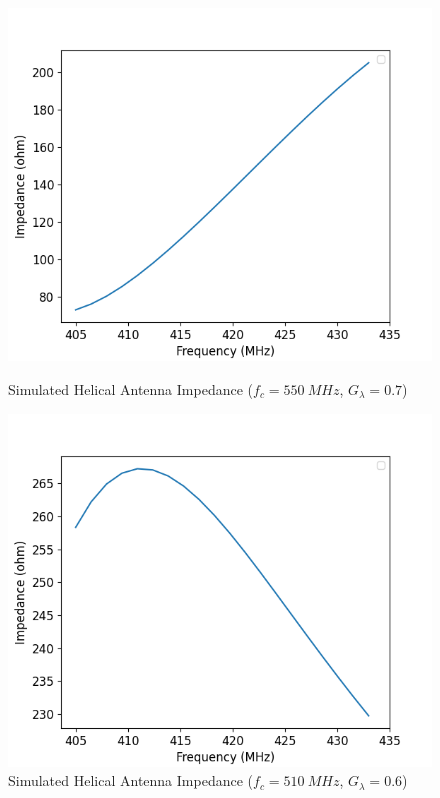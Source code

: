 \begin{figure}[!htb]
  \begin{minipage}{.49\textwidth}
    \centering
    \includegraphics[width=1.0\linewidth]{helix3_impedance}
    \caption{Simulated Helical Antenna Impedance ($f_c = \SI{550}{MHz}$, $G_\lambda = 0.7$)}
    \label{fig:helix3_impedance}
  \end{minipage}
  \begin{minipage}{.49\textwidth}
    \centering
    \includegraphics[width=1.0\linewidth]{helix4_impedance}
    \caption{Simulated Helical Antenna Impedance ($f_c = \SI{510}{MHz}$, $G_\lambda = 0.6$)}
    \label{fig:helix4_impedance}
  \end{minipage}
\end{figure}


